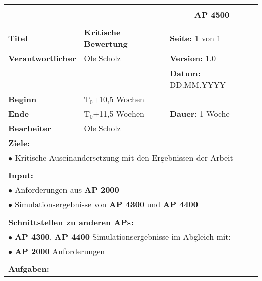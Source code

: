 \clearpage
\begin{table}[!h]
	\begin{center}
		\begin{tabular}{|p{35mm}||p{55mm}|p{50mm}||p{40mm}|}
			\hline
			\multicolumn{3}{|l||}{\textbf{}} & \multicolumn{1}{c|}{}\\
			\multicolumn{3}{|l||}{\textbf{}} & \multicolumn{1}{c|}{\textbf{AP 4500}}\\
			\multicolumn{3}{|l||}{\textbf{}} & \multicolumn{1}{c|}{}\\
			\hline\hline
			\textbf{Titel} & \multicolumn{2}{p{7cm}||}{\textbf{Kritische Bewertung}} 
			& \textbf{Seite:} 1 von 1\\
			\hline
			\textbf{Verantwortlicher} & \multicolumn{2}{l||}{Ole Scholz} & \textbf{Version:} 1.0\\
			\hline
			\multicolumn{3}{|l||}{} & \textbf{Datum:} DD.MM.YYYY\\
			\hline\hline
			\textbf{Beginn} & \multicolumn{2}{l||}{T$_0$+10,5 Wochen} & \\
			\hline
			\textbf{Ende} & \multicolumn{2}{l||}{T$_0$+11,5 Wochen} & \textbf{Dauer}: 1 Woche\\
			\hline\hline
			\textbf{Bearbeiter} & \multicolumn{3}{l|}{Ole Scholz}\\
			\hline\hline
			\multicolumn{4}{|p{150mm}|}{\textbf{Ziele:}}\\
			\multicolumn{4}{|p{150mm}|}{$\bullet$ Kritische Auseinandersetzung mit den Ergebnissen der Arbeit}\\
			\multicolumn{4}{|p{150mm}|}{}\\
			\multicolumn{4}{|p{150mm}|}{\textbf{Input:}}\\
			\multicolumn{4}{|p{150mm}|}{$\bullet$ Anforderungen aus \textbf{AP 2000}}\\
			\multicolumn{4}{|p{150mm}|}{$\bullet$ Simulationsergebnisse von \textbf{AP 4300} und \textbf{AP 4400}}\\
			\multicolumn{4}{|p{150mm}|}{}\\
			\multicolumn{4}{|p{150mm}|}{\textbf{Schnittstellen zu anderen APs:}}\\
			\multicolumn{4}{|p{150mm}|}{$\bullet$ \textbf{AP 4300}, \textbf{AP 4400} Simulationsergebnisse im Abgleich mit: }\\
			\multicolumn{4}{|p{150mm}|}{$\bullet$ \textbf{AP 2000} Anforderungen}\\
			\multicolumn{4}{|p{150mm}|}{}\\
			\multicolumn{4}{|p{150mm}|}{\textbf{Aufgaben:}}\\

\end{tabular}
\end{center}
\end{table}
